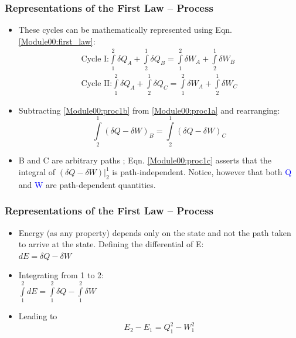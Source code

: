 \documentclass[10pt,compress,handout,ignorenonframetext]{beamer}
\begin{document}
\begin{frame}
 \frametitle{Representations of the First Law -- Process}
   \begin{itemize}
    \item <1-> These cycles can be mathematically represented using Eqn. \ref{Module00:first_law}:
   \begin{eqnarray}
    \text{Cycle I:}  \int\limits_{1}^{2}\delta Q_{A} + \int\limits_{2}^{1}\delta Q_{B} = \int\limits_{1}^{2}\delta W_{A} + \int\limits_{2}^{1}\delta W_{B}  \label{Module00:proc1a}\\
    \text{Cycle II:} \int\limits_{1}^{2}\delta Q_{A} + \int\limits_{2}^{1}\delta Q_{C} = \int\limits_{1}^{2}\delta W_{A} + \int\limits_{2}^{1}\delta W_{C}  \label{Module00:proc1b}
   \end{eqnarray}
   \item <2-> Subtracting \ref{Module00:proc1b} from \ref{Module00:proc1a} and rearranging:
   \begin{equation}
    \int\limits_{2}^{1}\left(\delta Q- \delta W\right)_{B} = \int\limits_{2}^{1}\left(\delta Q- \delta W\right)_{C}\label{Module00:proc1c}
   \end{equation}
   \item <3-> B and C are arbitrary paths ; Eqn. \ref{Module00:proc1c} asserts that the integral of $\left(\delta Q -\delta W\right)\left.\right|_{2}^{1}$ is path-independent. Notice, however that both \textcolor{blue}{Q} and \textcolor{blue}{W} are path-dependent quantities. 
    \end{itemize}
\end{frame}



\begin{frame}
 \frametitle{Representations of the First Law -- Process}

  \begin{itemize}
   \item <1-> Energy (as any property) depends only on the state and not the path taken to arrive at the state. Defining the differential of E:\\
    $dE =\delta Q - \delta W$\\ 
   
   \item <2-> Integrating from 1 to 2:\\
    $\displaystyle\int\limits_{1}^{2}dE =\displaystyle\int\limits_{1}^{2}\delta Q - \displaystyle\int\limits_{1}^{2}\delta W$\\ 

   \item <3-> Leading to
   \begin{equation}
    E_{2} - E_{1} = Q_{1}^{2}- W_{1}^{2} \label{Module00:proc1a}
   \end{equation}

  \end{itemize}
\normalsize
\end{frame}
\end{document}
